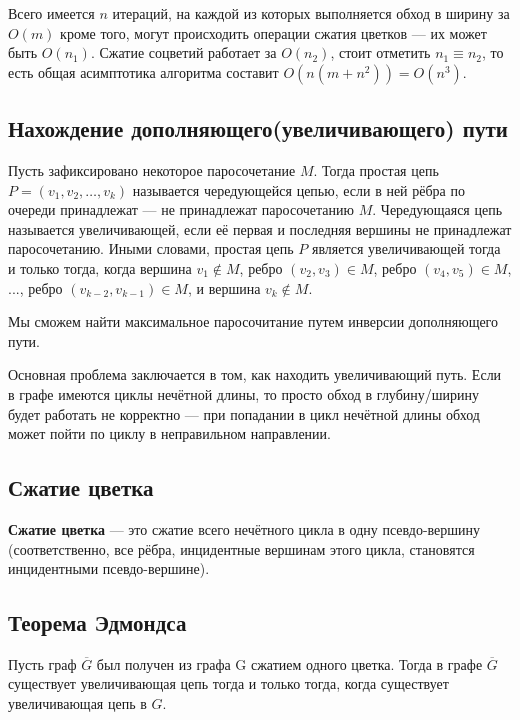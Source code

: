 \documentclass[14pt, a4paper]{extarticle}
\begin{document}
    Всего имеется $n$ итераций, на каждой из которых выполняется обход в ширину за $O(m)$ кроме того, могут происходить операции сжатия цветков — их может быть $O(n_1)$. Сжатие соцветий работает за $O(n_2)$, стоит отметить $n_1 \equiv n_2$, то есть общая асимптотика алгоритма составит $O(n(m+n^2))=O(n^3)$.

    \subsection*{Нахождение дополняющего(увеличивающего) пути}

    Пусть зафиксировано некоторое паросочетание $M$. Тогда простая цепь $P = (v_1, v_2, \ldots, v_k)$ называется чередующейся цепью, если в ней рёбра по очереди принадлежат --- не принадлежат паросочетанию $M$. Чередующаяся цепь называется увеличивающей, если её первая и последняя вершины не принадлежат паросочетанию. Иными словами, простая цепь $P$ является увеличивающей тогда и только тогда, когда вершина $v_1 \not\in M$, ребро $(v_2,v_3) \in M$, ребро $(v_4,v_5) \in M$, ..., ребро $(v_{k-2},v_{k-1}) \in M$, и вершина $v_k \not\in M$.

    Мы сможем найти максимальное паросочитание путем инверсии дополняющего пути.

    Основная проблема заключается в том, как находить увеличивающий путь. Если в графе имеются циклы нечётной длины, то просто обход в глубину/ширину будет работать не корректно --- при попадании в цикл нечётной длины обход может пойти по циклу в неправильном направлении.

    \pagebreak

    \subsection*{Сжатие цветка}

    \textbf{Сжатие цветка} — это сжатие всего нечётного цикла в одну псевдо-вершину (соответственно, все рёбра, инцидентные вершинам этого цикла, становятся инцидентными псевдо-вершине).
    
    \subsection*{Теорема Эдмондса}

    Пусть граф $\overline G$ был получен из графа G сжатием одного цветка.
    Тогда в графе $\overline G$ существует увеличивающая цепь тогда и только тогда, когда существует увеличивающая цепь в $G$.
\end{document}
